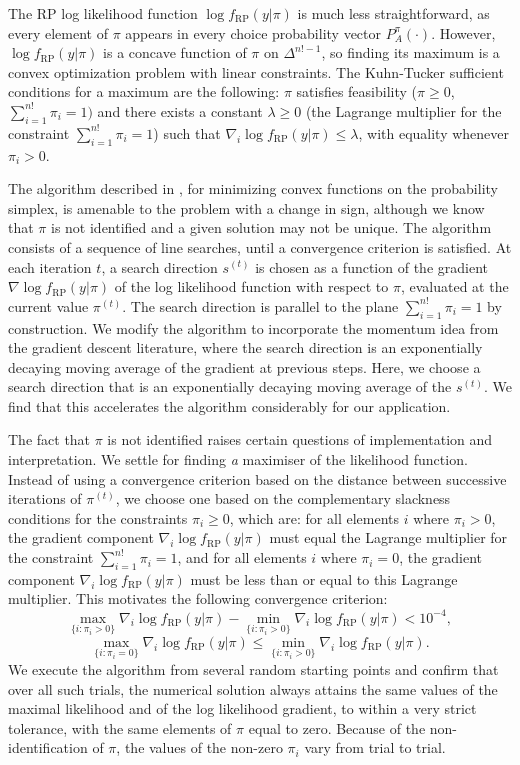 \documentclass[11pt,letter]{article}
\begin{document}
The RP log likelihood function $\log f_\mathrm{RP}(y|\pi)$ is much less straightforward, as every element of $\pi$ appears in every choice probability vector $P^\pi_A(\cdot)$.
However, $\log f_{\mathrm{RP}}(y|\pi)$ is a concave function of $\pi$ on $\Delta^{n!-1}$, so finding its maximum is a convex optimization problem with linear constraints.
The Kuhn-Tucker sufficient conditions for a maximum are the following: $\pi$ satisfies feasibility ($\pi \geq 0$, $\sum_{i=1}^{n!} \pi_i = 1)$ and there exists a constant $\lambda \geq 0$ (the Lagrange multiplier for the constraint $\sum_{i=1}^{n!} \pi_i = 1$) such that $\nabla_i \log f_{\mathrm{RP}}(y|\pi) \leq \lambda$, with equality whenever $\pi_i > 0$.

The algorithm described in , for minimizing convex functions on the probability simplex, is amenable to the problem with a change in sign, although we know that $\pi$ is not identified and a given solution may not be unique.
The algorithm consists of a sequence of line searches, until a convergence criterion is satisfied.
At each iteration $t$, a search direction $s^{(t)}$ is chosen as a function of the gradient $\nabla \log f_{\mathrm{RP}}(y|\pi)$ of the log likelihood function with respect to $\pi$, evaluated at the current value $\pi^{(t)}$.
The search direction is parallel to the plane $\sum_{i=1}^{n!} \pi_i = 1$ by construction.
We modify the algorithm to incorporate the momentum idea from the gradient descent literature, where the search direction is an exponentially decaying moving average of the gradient at previous steps.
Here, we choose a search direction that is an exponentially decaying moving average of the $s^{(t)}$.
We find that this accelerates the algorithm considerably for our application.

The fact that $\pi$ is not identified raises certain questions of implementation and interpretation.
We settle for finding {\em a} maximiser of the likelihood function.
Instead of using a convergence criterion based on the distance between successive iterations of $\pi^{(t)}$, we choose one based on the complementary slackness conditions for the constraints $\pi_i \geq 0$, which are: for all elements $i$ where $\pi_i > 0$, the gradient component $\nabla_i \log f_{\mathrm{RP}}(y|\pi)$ must equal the Lagrange multiplier for the constraint $\sum_{i=1}^{n!} \pi_i = 1$, and for all elements $i$ where $\pi_i = 0$, the gradient component $\nabla_i \log f_{\mathrm{RP}}(y|\pi)$ must be less than or equal to this Lagrange multiplier.
This motivates the following convergence criterion:
\[
  \max_{\{i\colon \pi_i>0\}} \nabla_i \log f_{\mathrm{RP}}(y|\pi) -
  \min_{\{i\colon \pi_i>0\}} \nabla_i \log f_{\mathrm{RP}}(y|\pi) < 10^{-4},
\]
\[
  \max_{\{i\colon \pi_i=0\}} \nabla_i \log f_{\mathrm{RP}}(y|\pi) \leq
  \min_{\{i\colon \pi_i>0\}} \nabla_i \log f_{\mathrm{RP}}(y|\pi).
\]
We execute the algorithm from several random starting points and confirm that over all such trials, the numerical solution always attains the same values of the maximal likelihood and of the log likelihood gradient, to within a very strict tolerance, with the same elements of $\pi$ equal to zero.
Because of the non-identification of $\pi$, the values of the non-zero $\pi_i$ vary from trial to trial.
\end{document}

